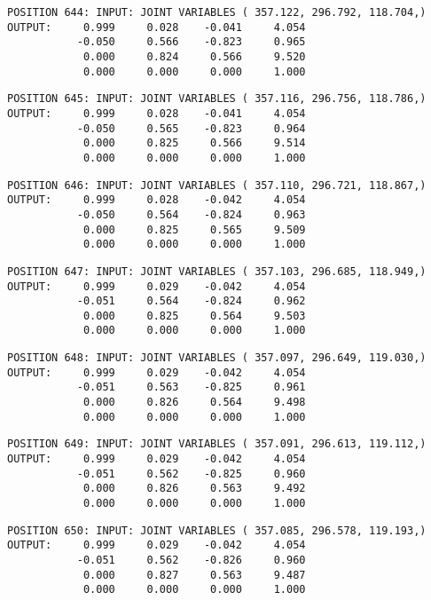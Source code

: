 \begin{verbatim}
POSITION 644: INPUT: JOINT VARIABLES ( 357.122, 296.792, 118.704,)
OUTPUT:     0.999     0.028    -0.041     4.054
           -0.050     0.566    -0.823     0.965
            0.000     0.824     0.566     9.520
            0.000     0.000     0.000     1.000
\end{verbatim} \pagebreak[1]\begin{verbatim}
POSITION 645: INPUT: JOINT VARIABLES ( 357.116, 296.756, 118.786,)
OUTPUT:     0.999     0.028    -0.041     4.054
           -0.050     0.565    -0.823     0.964
            0.000     0.825     0.566     9.514
            0.000     0.000     0.000     1.000
\end{verbatim} \pagebreak[1]\begin{verbatim}
POSITION 646: INPUT: JOINT VARIABLES ( 357.110, 296.721, 118.867,)
OUTPUT:     0.999     0.028    -0.042     4.054
           -0.050     0.564    -0.824     0.963
            0.000     0.825     0.565     9.509
            0.000     0.000     0.000     1.000
\end{verbatim} \pagebreak[1]\begin{verbatim}
POSITION 647: INPUT: JOINT VARIABLES ( 357.103, 296.685, 118.949,)
OUTPUT:     0.999     0.029    -0.042     4.054
           -0.051     0.564    -0.824     0.962
            0.000     0.825     0.564     9.503
            0.000     0.000     0.000     1.000
\end{verbatim} \pagebreak[1]\begin{verbatim}
POSITION 648: INPUT: JOINT VARIABLES ( 357.097, 296.649, 119.030,)
OUTPUT:     0.999     0.029    -0.042     4.054
           -0.051     0.563    -0.825     0.961
            0.000     0.826     0.564     9.498
            0.000     0.000     0.000     1.000
\end{verbatim} \pagebreak[1]\begin{verbatim}
POSITION 649: INPUT: JOINT VARIABLES ( 357.091, 296.613, 119.112,)
OUTPUT:     0.999     0.029    -0.042     4.054
           -0.051     0.562    -0.825     0.960
            0.000     0.826     0.563     9.492
            0.000     0.000     0.000     1.000
\end{verbatim} \pagebreak[1]\begin{verbatim}
POSITION 650: INPUT: JOINT VARIABLES ( 357.085, 296.578, 119.193,)
OUTPUT:     0.999     0.029    -0.042     4.054
           -0.051     0.562    -0.826     0.960
            0.000     0.827     0.563     9.487
            0.000     0.000     0.000     1.000
\end{verbatim} \pagebreak[1]\begin{verbatim}

\end{verbatim}
